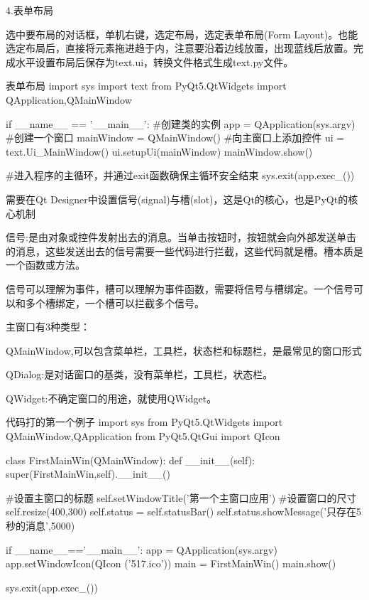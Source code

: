 \documentclass[openbib]{article}
\begin{document}
\begin{center}
	4.表单布局
\end{center}
选中要布局的对话框，单机右键，选定布局，选定表单布局(Form Layout)。也能选定布局后，直接将元素拖进趋于内，注意要沿着边线放置，出现蓝线后放置。完成水平设置布局后保存为text.ui，转换文件格式生成text.py文件。
\begin{Python}{表单布局}
import sys
import text
from PyQt5.QtWidgets import QApplication,QMainWindow

if __name__ == '__main__':
	#创建类的实例
	app = QApplication(sys.argv)
	#创建一个窗口
	mainWindow = QMainWindow()
	#向主窗口上添加控件
	ui = text.Ui_MainWindow()
	ui.setupUi(mainWindow)
	mainWindow.show()
	
	#进入程序的主循环，并通过exit函数确保主循环安全结束
	sys.exit(app.exec_())
\end{Python}

需要在Qt Designer中设置信号(signal)与槽(slot)，这是Qt的核心，也是PyQt的核心机制

信号:是由对象或控件发射出去的消息。当单击按钮时，按钮就会向外部发送单击的消息，这些发送出去的信号需要一些代码进行拦截，这些代码就是槽。槽本质是一个函数或方法。

信号可以理解为事件，槽可以理解为事件函数，需要将信号与槽绑定。一个信号可以和多个槽绑定，一个槽可以拦截多个信号。

主窗口有3种类型：

QMainWindow,可以包含菜单栏，工具栏，状态栏和标题栏，是最常见的窗口形式

QDialog:是对话窗口的基类，没有菜单栏，工具栏，状态栏。

QWidget:不确定窗口的用途，就使用QWidget。
\begin{Python}{代码打的第一个例子}
import sys
from PyQt5.QtWidgets import QMainWindow,QApplication
from PyQt5.QtGui import QIcon

class FirstMainWin(QMainWindow):
	def __init__(self):
		super(FirstMainWin,self).__init__()
		
		#设置主窗口的标题
		self.setWindowTitle('第一个主窗口应用')
		#设置窗口的尺寸
		self.resize(400,300)
		self.status = self.statusBar()
		self.status.showMessage('只存在5秒的消息',5000)

if __name__=='__main__':
app = QApplication(sys.argv)
app.setWindowIcon(QIcon ('517.ico'))
main = FirstMainWin()
main.show()

sys.exit(app.exec_())
	
\end{Python}
\end{document}
